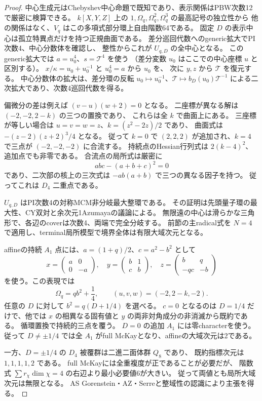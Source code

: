\begin{proof}
中心生成元はChebyshev中心命題で既知であり、表示関係はPBW次数12で厳密に検算できる。
$k[X,Y,Z]$ 上の $1,\Omega_q,\Omega_q^2,\Omega_q^3$ の最高記号の独立性から
他の関係はなく、$V_q$ はこの多項式部分環上自由階数64である。
固定 $D$ の表示中心は孤立特異点だけを持つ正規曲面である。
差分巡回代数へのgeneric拡大でPI次数4、中心分数体を確認し、
整性からこれが $U_{q,D}$ の全中心となる。
このgeneric拡大では $a=u_0^4$、$s=\mathcal T^4$ を使う
（差分変数 $u_0$ はここでの中心座標 $u$ と区別する）。
$x/\kappa=u_0+u_0^{-1}$ と $u_0^4=a$ から $u_0$ を、
次に $y,z$ から $\mathcal T$ を復元する。
中心分数体の拡大は、差分環の反転
$u_0\mapsto u_0^{-1}$、$\mathcal T\mapsto b_D(u_0)\mathcal T^{-1}$
による二次拡大であり、次数4巡回代数を得る。

偏微分の差は例えば $(v-u)(w+2)=0$ となる。
二座標が異なる解は $(-2,-2,2-k)$ の三つの置換であり、
これらは全 $k$ で曲面上にある。
三座標が等しい場合は $u=v=w=z$、$k=(z^2-2z)/2$ であり、
曲面式は $-(z-2)(z+2)^3/4$ となる。
従って $k=0$ で $(2,2,2)$ が追加され、$k=4$ で三点が $(-2,-2,-2)$ に合流する。
持続点のHessian行列式は $2(k-4)^2$、追加点でも非零である。
合流点の局所式は厳密に
\[
 abc-(a+b+c)^2=0
\]
であり、二次部の核上の三次式は $-ab(a+b)$ で三つの異なる因子を持つ。
従ってこれは $D_4$ 二重点である。

$U_{q,D}$ はPI次数4の対称MCM非分岐最大整環である。
その証明は先頭量子環の最大性、CY双対と余次元1Azumayaの議論による。
無限遠の中心は滑らかな三角形で、各辺のcoverは次数4、両端で完全分岐する。
前節の主radical式を $N=4$ で適用し、terminal局所模型で境界全体は有限大域次元となる。

affineの持続 $A_1$ 点には、$a=(1+q)/2$、$c=a^2-b^2$ として
\[
 x=\begin{pmatrix}a&0\\0&-a\end{pmatrix},\quad
 y=\begin{pmatrix}b&1\\c&b\end{pmatrix},\quad
 z=\begin{pmatrix}b&q\\-qc&-b\end{pmatrix}
\]
を使う。この表現では
\[
 \Omega_q=qb^2+\frac14,\qquad
 (u,v,w)=(-2,2-k,-2).
\]
任意の $D$ に対して $b^2=q(D+1/4)$ を選べる。
$c=0$ となるのは $D=1/4$ だけで、他では $x$ の相異なる固有値と
$y$ の両非対角成分の非消滅から既約である。
循環置換で持続的三点を覆う。
$D=0$ の追加 $A_1$ には零characterを使う。
従って $D\ne\pm1/4$ では全 $A_1$ がfull McKayとなり、affineの大域次元は2である。

一方、$D=\pm1/4$ の $D_4$ 被覆群は二進二面体群 $Q_8$ であり、
既約指標次元は $1,1,1,1,2$ である。
full McKayには全重複度が正であることが必要だが、
階数式 $\sum r_\chi\dim\chi=4$ の右辺より最小必要値6が大きい。
従って両値とも局所大域次元は無限となる。
AS Gorenstein・AZ・Serreと整域性の認識により主張を得る。
\end{proof}

